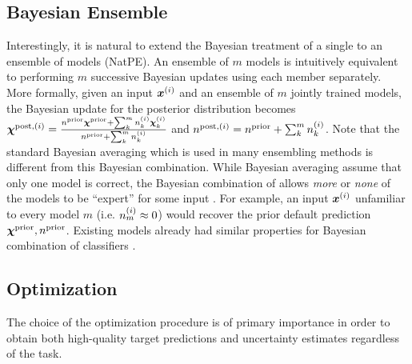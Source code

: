 \subsection{Bayesian \NatPNacro{} Ensemble} 
Interestingly, it is natural to extend the Bayesian treatment of a single \NatPNacro{} to an ensemble of \NatPNacro{} models (NatPE). An ensemble of $m$ \NatPNacro{} models is intuitively equivalent to performing $m$ successive Bayesian updates using each \NatPNacro{} member separately. More formally, given an input $\bm{x}^{(i)}$ and an ensemble of $m$ jointly trained \NatPNacro{} models, the Bayesian update for the posterior distribution becomes ${\bm{\chi}^{\text{post}, (i)} = \frac{n^\text{prior}\bm{\chi}^\text{prior} + \sum_k^{m} n_k^{(i)} \bm{\chi}_k^{(i)}}{n^\text{prior} + \sum_k^{m} n_k^{(i)}}}$ and ${n^{\text{post}, (i)} = n^\text{prior} + \sum_k^{m} n_k^{(i)}}$. %
Note that the standard Bayesian averaging which is used in many ensembling methods \citep{bayesian-ensemble-learning,ensembles,batch-ensembles,hyper-ensembles} is different from this Bayesian combination. While Bayesian averaging assume that only one model is correct, the Bayesian combination of \NatPNacro{} allows \emph{more} or \emph{none} of the models to be ``expert'' for some input  \citep{bayesian-averaging-to-combination}. For example, an input $\bm{x}^{(i)}$ unfamiliar to every model $m$ (i.e. $n_m^{(i)} \approx 0$) would recover the prior default prediction $\bm{\chi}^\text{prior}, n^\text{prior}$. Existing models already had similar properties for Bayesian combination of classifiers \citep{bayesian-classifier-combination, dynamic-bayesian-combination-classifiers}.

\subsection{Optimization}
\label{sec:optimization}

The choice of the optimization procedure is of primary importance in order to obtain both high-quality target predictions and uncertainty estimates regardless of the task.

